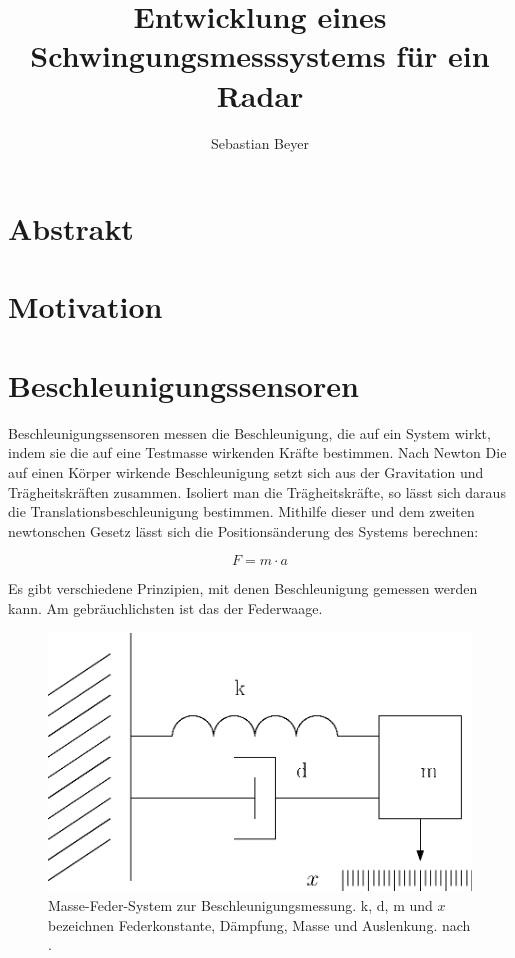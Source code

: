 \documentclass[12pt,a4paper]{scrartcl}
\begin{document}
\title {Entwicklung eines Schwingungsmesssystems für ein Radar}
\author{Sebastian Beyer}
\maketitle

\newpage

\tableofcontents
\newpage




\section{Abstrakt}

\newpage

\section{Motivation}

\newpage

\section{Beschleunigungssensoren}
\onehalfspacing
Beschleunigungssensoren messen die Beschleunigung, die auf ein System wirkt, indem sie die auf eine Testmasse wirkenden Kräfte bestimmen. Nach Newton  Die auf einen Körper wirkende Beschleunigung setzt sich aus der Gravitation und Trägheitskräften zusammen. Isoliert man die Trägheitskräfte, so lässt sich daraus die Translationsbeschleunigung bestimmen. Mithilfe dieser und dem zweiten newtonschen Gesetz lässt sich die Positionsänderung des Systems berechnen: 

\begin{equation}
F = m \cdot a
\end{equation}

Es gibt verschiedene Prinzipien, mit denen Beschleunigung gemessen werden kann. Am gebräuchlichsten ist das der Federwaage.

\begin{figure}[H]
\centering
\includegraphics[scale=0.7]{federmasse.eps}
\caption{Masse-Feder-System zur Beschleunigungsmessung. k, d, m und $x$ bezeichnen Federkonstante, Dämpfung, Masse und Auslenkung. nach \citep{Klingbeil:2006qy}.}
\label{federwaage}
\end{figure}
\end{document}

